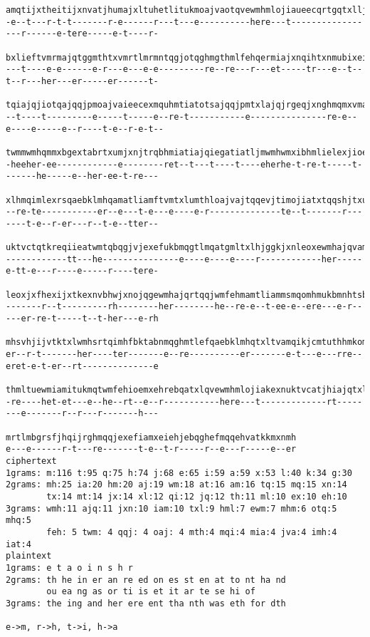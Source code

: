   \begin{Verbatim}[frame=single,fontsize=\tiny]
amqtijxtheitijxnvatjhumajxltuhetlitukmoajvaotqvewmhmlojiaueecqrtgqtxlljtnhtrqtqjmximhmlajqqmtiqgbxhe
-e--t---r-t-t-------r-e------r---t---e----------here---t-----------------r------e-tere-----e-t----r-

bxlieftvmrmajqtggmthtxvmrtlmrmntqgjotqghmgthmlfehqermiajxnqihtxnmubixeifehqeewmhgeomhjxntgmhqextkjis
---t----e-e------e-r---e---e-e---------re--re---r---et-----tr---e--t--t--r---her---er-----er------t-

tqiajqjiotqajqqjpmoajvaieecexmquhmtiatotsajqqjpmtxlajqjrgeqjxnghmqmxvmajqamtlotqmxehrebqiamkthnmqija
--t----t---------e-----t-----e--re-t-----------e---------------re-e--e----e-----e--r----t-e--r-e-t--

twmmwmhqmmxbgextabrtxumjxnjtrqbhmiatiajqiegatiatljmwmhwmxibhmlielexjioebklatwmqkjggmlewmhrmmxijhmkst
-heeher-ee------------e--------ret--t---t----t----eherhe-t-re-t-----t-------he-----e--her-ee-t-re---

xlhmqimlexrsqaebklmhqamatliamftvmtxlumthloajvajtqqevjtimojiatxtqqshjtxubkkiamfehrmhfkehjliamktiimhqe
--re-te-----------er--e---t-e---e----e-r--------------te--t-------r-------t-e--r-er---r--t-e--tter--

uktvctqtkreqiieatwmtqbqgjvjexefukbmqgtlmqatgmltxlhjggkjxnleoxewmhajqvamqiiamatjhotqgmvbkjthgktqimhml
------------tt---he---------------e----e----e----r------------her-----e-tt-e---r----e-----r----tere-

leoxjxfhexijxtkexnvbhwjxnojqgewmhajqrtqqjwmfehmamtliammsmqomhmukbmnhtsbxlmhnhmtiuktvcibfiqwmhsvkmthw
-------r--t---------rh--------her--------he--re-e--t-ee-e--ere---e-r-----er-re-t-----t--t-her---e-rh

mhsvhjijvtktxlwmhsrtqimhfbktabnmqghmtlefqaebklmhqtxltvamqikjcmtuthhmkomhmiameiamhgthiqefajroajvatggm
er--r-t-------her----ter-------e--re----------er-------e-t---e---rre--eret-e-t-er--rt--------------e

thmltuewmiamitukmqtwmfehioemxehrebqatxlqvewmhmlojiakexnuktvcatjhiajqtxltumkkeojxnhethjxnhbrukjxnwejv
-re----het-et---e--he--rt--e--r-----------here---t-------------rt--------e-------r--r---r-------h---

mrtlmbgrsfjhqijrghmqqjexefiamxeiehjebqghefmqqehvatkkmxnmh
e---e------r-t---re-------t-e--t-r-----r--e---r-----e--er
ciphertext
1grams: m:116 t:95 q:75 h:74 j:68 e:65 i:59 a:59 x:53 l:40 k:34 g:30
2grams: mh:25 ia:20 hm:20 aj:19 wm:18 at:16 am:16 tq:15 mq:15 xn:14
        tx:14 mt:14 jx:14 xl:12 qi:12 jq:12 th:11 ml:10 ex:10 eh:10
3grams: wmh:11 ajq:11 jxn:10 iam:10 txl:9 hml:7 ewm:7 mhm:6 otq:5 mhq:5
        feh: 5 twm: 4 qqj: 4 oaj: 4 mth:4 mqi:4 mia:4 jva:4 imh:4 iat:4
plaintext
1grams: e t a o i n s h r
2grams: th he in er an re ed on es st en at to nt ha nd
        ou ea ng as or ti is et it ar te se hi of
3grams: the ing and her ere ent tha nth was eth for dth

e->m, r->h, t->i, h->a
\end{Verbatim}

